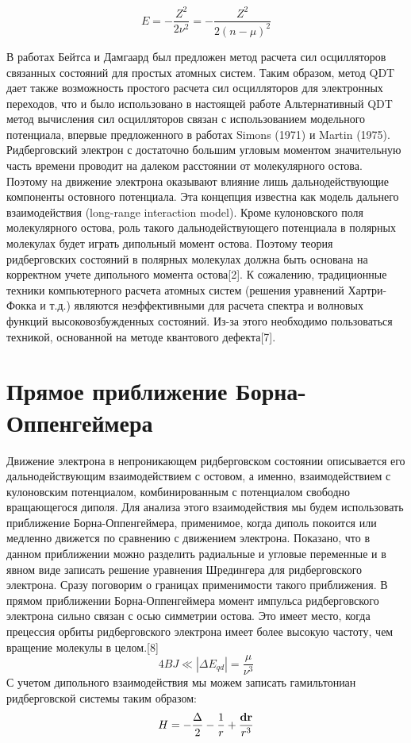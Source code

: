 \documentclass[]{interact}
\theoremstyle{plain}%
\theoremstyle{definition}
\theoremstyle{remark}
\begin{document}
\begin{equation}
E=-\frac{Z^2}{2\nu^2}=-\frac{Z^2}{2\left(n-\mu\right)^2}
\end{equation}

В работах Бейтса и Дамгаард был предложен метод расчета сил осцилляторов связанных состояний для простых атомных систем. Таким образом, метод QDT дает также возможность простого расчета сил осцилляторов для электронных переходов, что и было использовано в настоящей работе
Альтернативный QDT метод вычисления сил осцилляторов связан с использованием модельного потенциала, впервые предложенного в работах Simons (1971) и Martin (1975).
Ридберговский электрон с достаточно большим угловым моментом значительную часть времени проводит на далеком расстоянии от молекулярного остова. Поэтому на движение электрона оказывают влияние лишь дальнодействующие компоненты остовного потенциала. Эта концепция известна как модель дальнего взаимодействия (long-range interaction model). Кроме кулоновского поля молекулярного остова, роль такого дальнодействующего потенциала в полярных молекулах будет играть дипольный момент остова. Поэтому теория ридберговских состояний в полярных молекулах должна быть основана на корректном учете дипольного момента остова[2].
К сожалению, традиционные техники компьютерного расчета атомных систем (решения уравнений Хартри-Фокка и т.д.) являются неэффективными для расчета спектра и волновых функций высоковозбужденных состояний. Из-за этого необходимо пользоваться техникой, основанной на методе квантового дефекта[7].







\section{Прямое приближение Борна-Оппенгеймера}

Движение электрона в непроникающем ридберговском состоянии описывается его дальнодействующим взаимодействием с остовом, а именно, взаимодействием с кулоновским потенциалом, комбинированным с потенциалом свободно вращающегося диполя. Для анализа этого взаимодействия мы будем использовать приближение Борна-Оппенгеймера, применимое, когда диполь покоится или медленно движется по сравнению с движением электрона. Показано, что в данном приближении можно разделить радиальные и угловые переменные и в явном виде записать решение уравнения Шредингера для ридберговского электрона.
Сразу поговорим о границах применимости такого приближения. В прямом приближении Борна-Оппенгеймера момент импульса ридберговского электрона сильно связан с осью симметрии остова. Это имеет место, когда прецессия орбиты ридберговского электрона имеет более высокую частоту, чем вращение молекулы в целом.[8]
\begin{equation}
4BJ\ll|\Delta E_{qd}|=\frac{\mu}{\nu^3}
\end{equation}
С учетом дипольного взаимодействия мы можем записать гамильтониан ридберговской системы таким образом:
\begin{equation}
H=-\frac{\Delta}{2}-\frac{1}{r}+\frac{{\bf dr}}{r^3} 
\end{equation}
\end{document}
